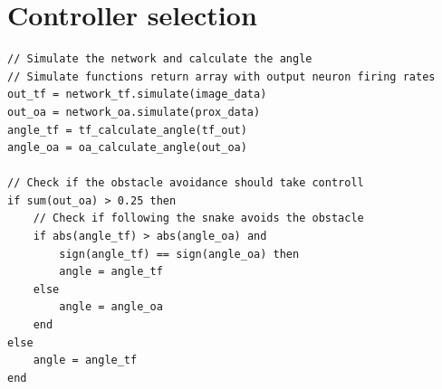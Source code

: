 \section{Controller selection}


\begin{lstlisting}[label=listing:select, caption=Controller selection]
// Simulate the network and calculate the angle
// Simulate functions return array with output neuron firing rates
out_tf = network_tf.simulate(image_data)
out_oa = network_oa.simulate(prox_data)
angle_tf = tf_calculate_angle(tf_out)
angle_oa = oa_calculate_angle(out_oa)

// Check if the obstacle avoidance should take controll
if sum(out_oa) > 0.25 then
	// Check if following the snake avoids the obstacle
	if abs(angle_tf) > abs(angle_oa) and 
		sign(angle_tf) == sign(angle_oa) then
		angle = angle_tf
	else
		angle = angle_oa
	end
else
	angle = angle_tf
end
\end{lstlisting}


